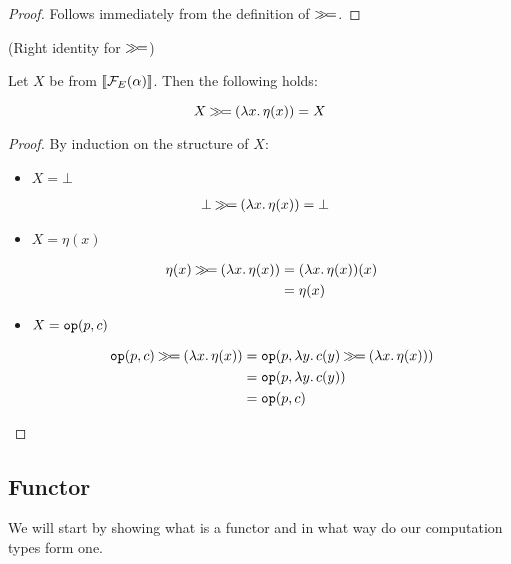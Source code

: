 \begin{proof}
  Follows immediately from the definition of $\mathbin{\gg\!=}$.
\end{proof}

\begin{law}\label{law:right-identity}
  (Right identity for $\mathbin{\gg\!=}$)
  
  Let $X$ be from $\llbracket \mathcal{F}_E(\alpha) \rrbracket$. Then the following holds:

  $$
  X \mathbin{\gg\!=} (\lambda x.\, \eta(x)) = X
  $$
\end{law}

\begin{proof}
  By induction on the structure of $X$:
  
  \begin{itemize}
  \item $X = \bot$
    
    \vspace{-0.5cm}
    \begin{align*}
      \bot \mathbin{\gg\!=} (\lambda x.\, \eta(x))
      &= \bot
    \end{align*}
   
  \item $X = \eta(x)$
    
    \vspace{-0.5cm}
    \begin{align*}
      \eta(x) \mathbin{\gg\!=} (\lambda x.\, \eta(x))
      &= (\lambda x.\, \eta(x))(x) \\
      &= \eta(x)
    \end{align*}
    
  \item $X = \mathtt{op}(p, c)$

    \vspace{-0.5cm}
    \begin{align*}
      \mathtt{op}(p, c) \mathbin{\gg\!=} (\lambda x.\, \eta(x))
      &= \mathtt{op}(p, \lambda y.\, c(y) \mathbin{\gg\!=} (\lambda x.\, \eta(x))) \\
      &= \mathtt{op}(p, \lambda y.\, c(y)) \\
      &= \mathtt{op}(p, c)
    \end{align*}
  \end{itemize}
\end{proof}


\subsection{Functor}
\label{ssec:functor}

We will start by showing what is a functor and in what way do our
computation types form one.

